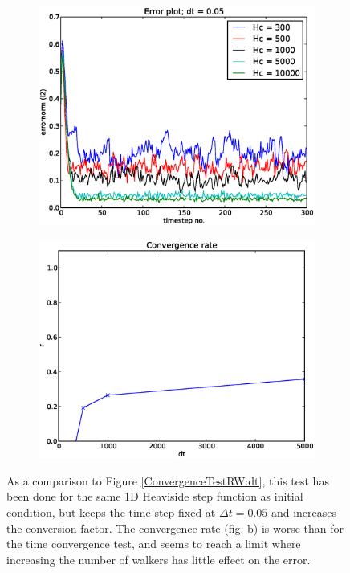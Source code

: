 \begin{figure}[h]
 \centering
 \begin{subfigure}[t]{0.48\textwidth}
  \includegraphics[width=\textwidth]{../results/experiment_02052014_0747_Redoing_RW_tests_Hc/results/errorplot.eps}
 \end{subfigure}
\begin{subfigure}[t]{0.48\textwidth}
 \includegraphics[width=\textwidth]{../results/experiment_02052014_0747_Redoing_RW_tests_Hc/results/ConvergenceTest.eps}
\end{subfigure}
\caption[Test RW]{As a comparison to Figure \ref{ConvergenceTestRW:dt}, this test has been done for the same 1D Heaviside step function as initial condition, but keeps the time step fixed at $\Delta t = 0.05$ and increases the conversion factor. The convergence rate (fig. b) is worse than for the time convergence test, and seems to reach a limit where increasing the number of walkers has little effect on the error.}
\label{ConvergenceTestRW:Hc}
\end{figure}
\clearpage
